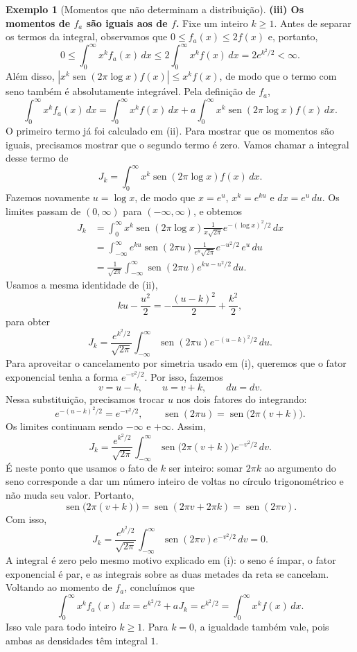 \documentclass[12pt,portuguese]{article}
\theoremstyle{definition}
\newtheorem{example}[example]{Exemplo}
\theoremstyle{plainexercise}
\theoremstyle{starredexercise}
\theoremstyle{definition}
\renewcommand{\sin}{\operatorname{sen}}
\begin{document}
\begin{example}[Momentos que não determinam a distribuição]
\smallskip
\noindent\textbf{(iii) Os momentos de $f_a$ são iguais aos de $f$.}
Fixe um inteiro $k\geqslant 1$. Antes de separar os termos da integral,
observamos que $0\leqslant f_a(x)\leqslant 2f(x)$ e, portanto,
\[
0\leqslant\int_0^\infty x^k f_a(x)\,dx
\leqslant 2\int_0^\infty x^k f(x)\,dx
=2e^{k^2/2}<\infty.
\]
Além disso, $|x^k\sin(2\pi\log x)f(x)|\leqslant x^k f(x)$, de modo que
o termo com seno também é absolutamente integrável. Pela definição de $f_a$,
\[
\int_0^\infty x^k f_a(x)\,dx
=\int_0^\infty x^k f(x)\,dx
 +a\int_0^\infty x^k\sin(2\pi\log x)f(x)\,dx.
\]
O primeiro termo já foi calculado em (ii). Para mostrar que os momentos
são iguais, precisamos mostrar que o segundo termo é zero. Vamos chamar
a integral desse termo de
\[
J_k=\int_0^\infty x^k\sin(2\pi\log x)f(x)\,dx.
\]
Fazemos novamente $u=\log x$, de modo que $x=e^u$, $x^k=e^{ku}$ e
$dx=e^u\,du$. Os limites passam de $(0,\infty)$ para $(-\infty,\infty)$,
e obtemos
\begin{align*}
J_k
&=\int_0^\infty x^k\sin(2\pi\log x)
  \frac{1}{x\sqrt{2\pi}}e^{-(\log x)^2/2}\,dx
\\[0.3cm]
&=\int_{-\infty}^{\infty}e^{ku}\sin(2\pi u)
  \frac{1}{e^u\sqrt{2\pi}}e^{-u^2/2}\,e^u\,du
\\[0.3cm]
&=\frac{1}{\sqrt{2\pi}}\int_{-\infty}^{\infty}
  \sin(2\pi u)e^{ku-u^2/2}\,du.
\end{align*}
Usamos a mesma identidade de (ii),
\[
ku-\frac{u^2}{2}=-\frac{(u-k)^2}{2}+\frac{k^2}{2},
\]
para obter
\[
J_k=\frac{e^{k^2/2}}{\sqrt{2\pi}}
\int_{-\infty}^{\infty}\sin(2\pi u)e^{-(u-k)^2/2}\,du.
\]
Para aproveitar o cancelamento por simetria usado em (i), queremos que
o fator exponencial tenha a forma $e^{-v^2/2}$. Por isso, fazemos
\[
v=u-k,\qquad u=v+k,\qquad du=dv.
\]
Nessa substituição, precisamos trocar $u$ nos dois fatores do integrando:
\[
e^{-(u-k)^2/2}=e^{-v^2/2},
\qquad
\sin(2\pi u)=\sin\bigl(2\pi(v+k)\bigr).
\]
Os limites continuam sendo $-\infty$ e $+\infty$. Assim,
\[
J_k=\frac{e^{k^2/2}}{\sqrt{2\pi}}
\int_{-\infty}^{\infty}\sin\bigl(2\pi(v+k)\bigr)e^{-v^2/2}\,dv.
\]
É neste ponto que usamos o fato de $k$ ser inteiro: somar $2\pi k$ ao
argumento do seno corresponde a dar um número inteiro de voltas no círculo
trigonométrico e não muda seu valor. Portanto,
\[
\sin\bigl(2\pi(v+k)\bigr)=\sin(2\pi v+2\pi k)=\sin(2\pi v).
\]
Com isso,
\[
J_k=\frac{e^{k^2/2}}{\sqrt{2\pi}}
\int_{-\infty}^{\infty}\sin(2\pi v)e^{-v^2/2}\,dv=0.
\]
A integral é zero pelo mesmo motivo explicado em (i): o seno é ímpar,
o fator exponencial é par, e as integrais sobre as duas metades da reta
se cancelam. Voltando ao momento de $f_a$, concluímos que
\[
\int_0^\infty x^k f_a(x)\,dx
=e^{k^2/2}+aJ_k
=e^{k^2/2}
=\int_0^\infty x^k f(x)\,dx.
\]
Isso vale para todo inteiro $k\geqslant 1$. Para $k=0$, a igualdade
também vale, pois ambas as densidades têm integral $1$.


\end{example}
\end{document}

